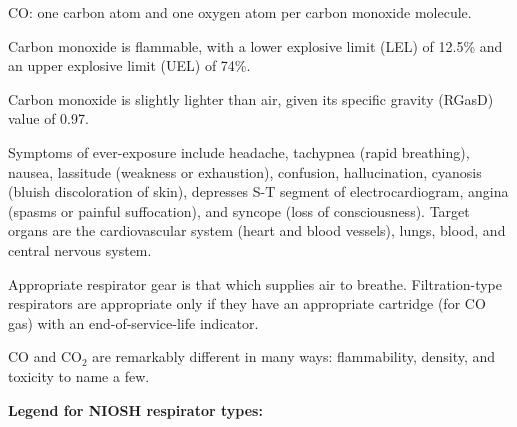 












CO: one carbon atom and one oxygen atom per carbon monoxide molecule.

\vskip 10pt

Carbon monoxide is flammable, with a lower explosive limit (LEL) of 12.5\% and an upper explosive limit (UEL) of 74\%.

\vskip 10pt

Carbon monoxide is slightly lighter than air, given its specific gravity (RGasD) value of 0.97.

\vskip 10pt

Symptoms of ever-exposure include headache, tachypnea (rapid breathing), nausea, lassitude (weakness or exhaustion), confusion, hallucination, cyanosis (bluish discoloration of skin), depresses S-T segment of electrocardiogram, angina (spasms or painful suffocation), and syncope (loss of consciousness).  Target organs are the cardiovascular system (heart and blood vessels), lungs, blood, and central nervous system.

\vskip 10pt

Appropriate respirator gear is that which supplies air to breathe.  Filtration-type respirators are appropriate only if they have an appropriate cartridge (for CO gas) with an end-of-service-life indicator.

\vskip 10pt

CO and CO$_{2}$ are remarkably different in many ways: flammability, density, and toxicity to name a few.

\vskip 10pt

\noindent
{\bf Legend for NIOSH respirator types:}

